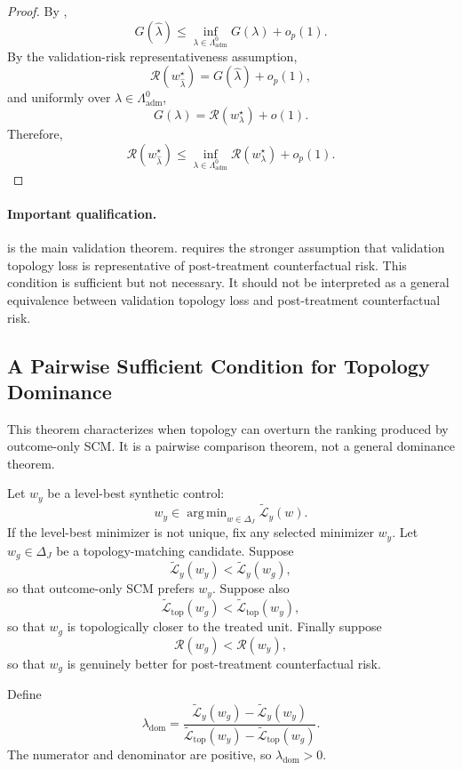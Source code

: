 \documentclass[11pt]{article}
\theoremstyle{plain}
\theoremstyle{definition}
\theoremstyle{remark}
\DeclareMathOperator*{\argmin}{arg\,min}
\newcommand{\1}{\mathbbm{1}}
\newcommand{\adm}{\mathrm{adm}}
\begin{document}
\begin{proof}
By ,
\[
G(\widehat\lambda)
\le
\inf_{\lambda\in\Lambda_{\adm}^0}G(\lambda)+o_p(1).
\]
By the validation-risk representativeness assumption,
\[
\mathcal R(w_{\widehat\lambda}^\star)
=
G(\widehat\lambda)+o_p(1),
\]
and uniformly over \(\lambda\in\Lambda_{\adm}^0\),
\[
G(\lambda)
=
\mathcal R(w_\lambda^\star)+o(1).
\]
Therefore,
\[
\mathcal R(w_{\widehat\lambda}^\star)
\le
\inf_{\lambda\in\Lambda_{\adm}^0}
\mathcal R(w_\lambda^\star)
+
o_p(1).
\]
\end{proof}

\paragraph{Important qualification.}
 is the main validation theorem. 
requires the stronger assumption that validation topology loss is representative
of post-treatment counterfactual risk. This condition is sufficient but not
necessary. It should not be interpreted as a general equivalence between
validation topology loss and post-treatment counterfactual risk.

\subsection{A Pairwise Sufficient Condition for Topology Dominance}

This theorem characterizes when topology can overturn the ranking produced by
outcome-only SCM. It is a pairwise comparison theorem, not a general dominance
theorem.

Let \(w_y\) be a level-best synthetic control:
\[
w_y
\in
\argmin_{w\in\Delta_J}\widetilde{\mathcal L}_y(w).
\]
If the level-best minimizer is not unique, fix any selected minimizer \(w_y\).
Let \(w_g\in\Delta_J\) be a topology-matching candidate. Suppose
\[
\widetilde{\mathcal L}_y(w_y)
<
\widetilde{\mathcal L}_y(w_g),
\]
so that outcome-only SCM prefers \(w_y\). Suppose also
\[
\widetilde{\mathcal L}_{\mathrm{top}}(w_g)
<
\widetilde{\mathcal L}_{\mathrm{top}}(w_y),
\]
so that \(w_g\) is topologically closer to the treated unit. Finally suppose
\[
\mathcal R(w_g)<\mathcal R(w_y),
\]
so that \(w_g\) is genuinely better for post-treatment counterfactual risk.

Define
\[
\lambda_{\mathrm{dom}}
=
\frac{
\widetilde{\mathcal L}_y(w_g)
-
\widetilde{\mathcal L}_y(w_y)
}{
\widetilde{\mathcal L}_{\mathrm{top}}(w_y)
-
\widetilde{\mathcal L}_{\mathrm{top}}(w_g)
}.
\]
The numerator and denominator are positive, so \(\lambda_{\mathrm{dom}}>0\).
\end{document}
